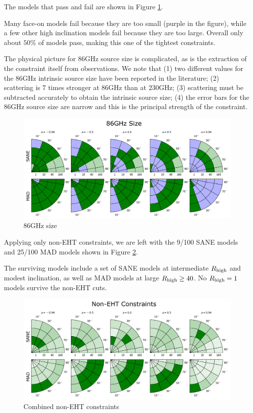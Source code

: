 The models that pass and fail are shown in Figure \ref{fig:cmp_86ghz_size}.

Many face-on models fail because they are too small (purple in the figure), while a few other high inclination models fail because they are too large.  Overall only about $50\%$ of models pass, making this one of the tightest constraints.

The physical picture for 86GHz source size is complicated, as is the extraction of the constraint itself from observations.  We note that (1) two different values for the 86GHz intrinsic source size have been reported in the literature; (2) scattering is $7$ times stronger at $86$GHz than at $230$GHz; (3) scattering must be subtracted accurately to obtain the intrinsic source size; (4) the error bars for the 86GHz source size are narrow and this is the principal strength of the constraint.

\begin{figure}
  \centering
  \includegraphics[width=\columnwidth]{./figures/86GHz_size_Constraints.png}
  \caption{86GHz size}
  \label{fig:cmp_86ghz_size}
\end{figure}


Applying only non-EHT constraints, we are left with the 9/100 SANE models and 25/100 MAD models shown in Figure \ref{fig:non_eht_cuts}.

The surviving models include a set of SANE models at intermediate $R_\mathrm{high}$ and modest inclination, as well as MAD models at large $R_\mathrm{high} \ge 40$.  No $R_\mathrm{high} = 1$ models survive the non-EHT cuts.

\begin{figure}
  \centering
  \includegraphics[width=\columnwidth]{./figures/Non_Interferometric_Constraints.png}
  \caption{Combined non-EHT constraints}
  \label{fig:non_eht_cuts}
\end{figure}

